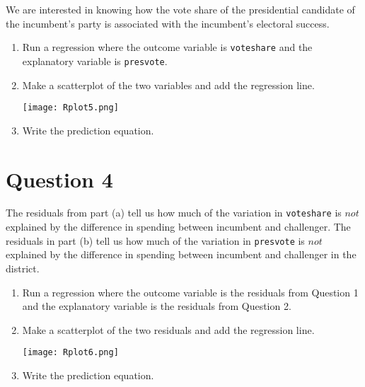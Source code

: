 \documentclass[12pt,letterpaper]{article}
\begin{document}
\noindent We are interested in knowing how the vote share of the presidential candidate of the incumbent's party is associated with the incumbent's electoral success.
\vspace{.25cm}
\begin{enumerate}
\item Run a regression where the outcome variable is \texttt{voteshare} and the explanatory variable is \texttt{presvote}.

		 
		
\vspace{5cm}
\item Make a scatterplot of the two variables and add the regression line. 

		 
		
									\texttt{[image: Rplot5.png]}
									
\vspace{5cm}
\item Write the prediction equation.

		 
		
\end{enumerate}

\newpage	
\section*{Question 4}%
\noindent The residuals from part (a) tell us how much of the variation in \texttt{voteshare} is $not$ explained by the difference in spending between incumbent and challenger. The residuals in part (b) tell us how much of the variation in \texttt{presvote} is $not$ explained by the difference in spending between incumbent and challenger in the district.
\begin{enumerate}
\item Run a regression where the outcome variable is the residuals from Question 1 and the explanatory variable is the residuals from Question 2.	\vspace{6cm}

		 

\item Make a scatterplot of the two residuals and add the regression line. 	\vspace{6cm}

		 
		
										\texttt{[image: Rplot6.png]}
											
\item Write the prediction equation.

		 
		
\end{enumerate}
\end{document}
